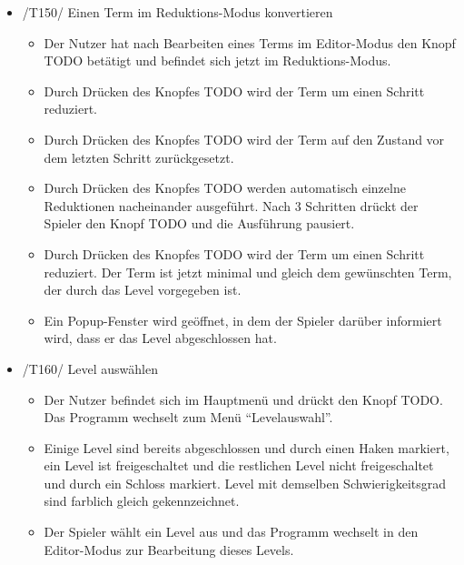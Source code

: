 \begin{itemize}
\item /T150/ Einen Term im Reduktions-Modus konvertieren
\begin{itemize}
\item Der Nutzer hat nach Bearbeiten eines Terms im Editor-Modus den Knopf TODO betätigt und befindet sich jetzt im Reduktions-Modus.
\item Durch Drücken des Knopfes TODO wird der Term um einen Schritt reduziert.
\item Durch Drücken des Knopfes TODO wird der Term auf den Zustand vor dem letzten Schritt zurückgesetzt.
\item Durch Drücken des Knopfes TODO werden automatisch einzelne Reduktionen nacheinander ausgeführt. Nach 3 Schritten drückt der Spieler den Knopf TODO und die Ausführung pausiert.
\item Durch Drücken des Knopfes TODO wird der Term um einen Schritt reduziert. Der Term ist jetzt minimal und gleich dem gewünschten Term, der durch das Level vorgegeben ist.
\item Ein Popup-Fenster wird geöffnet, in dem der Spieler darüber informiert wird, dass er das Level abgeschlossen hat.
\end{itemize}

\item /T160/ Level auswählen
\begin{itemize}
\item Der Nutzer befindet sich im Hauptmenü und drückt den Knopf TODO. Das Programm wechselt zum Menü "`Levelauswahl"'.
\item Einige Level sind bereits abgeschlossen und durch einen Haken markiert, ein Level ist freigeschaltet und die restlichen Level nicht freigeschaltet und durch ein Schloss markiert. Level mit demselben Schwierigkeitsgrad sind farblich gleich gekennzeichnet.
\item Der Spieler wählt ein Level aus und das Programm wechselt in den Editor-Modus zur Bearbeitung dieses Levels.
\end{itemize}


\end{itemize}
